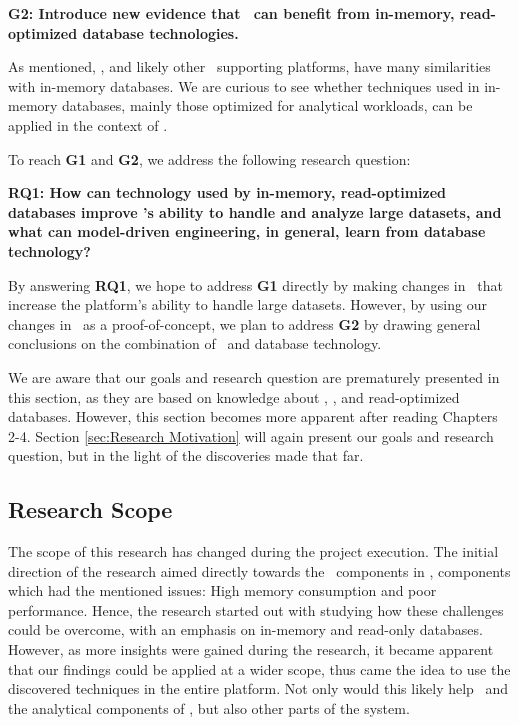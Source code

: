 \setlength{\leftskip}{1cm}

\textbf{G2: Introduce new evidence that \mde~can benefit from in-memory, read-optimized database technologies.}

\setlength{\leftskip}{0pt}

As mentioned, \gap, and likely other \mde~supporting platforms, have many similarities with in-memory databases. We are curious to see whether techniques used in in-memory databases, mainly those optimized for analytical workloads, can be applied in the context of \mde. 

To reach \textbf{G1} and \textbf{G2}, we address the following research question:

\setlength{\leftskip}{1cm}

\textbf{RQ1: How can technology used by in-memory, read-optimized databases improve \gap's ability to handle and analyze large datasets, and what can model-driven engineering, in general, learn from database technology?}

\setlength{\leftskip}{0pt}

By answering \textbf{RQ1}, we hope to address \textbf{G1} directly by making changes in \gap~that increase the platform's ability to handle large datasets. However, by using our changes in \gap~as a proof-of-concept, we plan to address \textbf{G2} by drawing general conclusions on the combination of \mde~and database technology.

We are aware that our goals and research question are prematurely presented in this section, as they are based on knowledge about \mde, \gap, and read-optimized databases. However, this section becomes more apparent after reading Chapters 2-4. Section \ref{sec:Research Motivation} will again present our goals and research question, but in the light of the discoveries made that far.

\subsection{Research Scope}
\label{sub:Research Scope}
The scope of this research has changed during the project execution. The initial direction of the research aimed directly towards the \bi~components in \gap, components which had the mentioned issues: High memory consumption and poor performance. Hence, the research started out with studying how these challenges could be overcome, with an emphasis on in-memory and read-only databases. However, as more insights were gained during the research, it became apparent that our findings could be applied at a wider scope, thus came the idea to use the discovered techniques in the entire platform. Not only would this likely help \bi~and the analytical components of \gap, but also other parts of the system.

